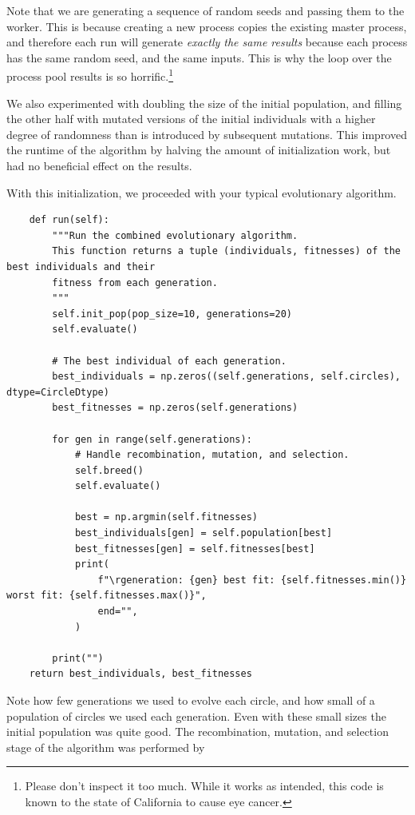 \documentclass{article}
\begin{document}
Note that we are generating a sequence of random seeds and passing them to the worker. This is because creating a new process copies the existing master process, and therefore each run will generate \textit{exactly the same results} because each process has the same random seed, and the same inputs. This is why the loop over the process pool results is so horrific.\footnote{Please don't inspect it too much. While it works as intended, this code is known to the state of California to cause eye cancer.}

We also experimented with doubling the size of the initial population, and filling the other half with mutated versions of the initial individuals with a higher degree of randomness than is introduced by subsequent mutations. This improved the runtime of the algorithm by halving the amount of initialization work, but had no beneficial effect on the results.

With this initialization, we proceeded with your typical evolutionary algorithm.

\begin{verbatim}
    def run(self):
        """Run the combined evolutionary algorithm.
        This function returns a tuple (individuals, fitnesses) of the best individuals and their
        fitness from each generation.
        """
        self.init_pop(pop_size=10, generations=20)
        self.evaluate()

        # The best individual of each generation.
        best_individuals = np.zeros((self.generations, self.circles), dtype=CircleDtype)
        best_fitnesses = np.zeros(self.generations)

        for gen in range(self.generations):
            # Handle recombination, mutation, and selection.
            self.breed()
            self.evaluate()

            best = np.argmin(self.fitnesses)
            best_individuals[gen] = self.population[best]
            best_fitnesses[gen] = self.fitnesses[best]
            print(
                f"\rgeneration: {gen} best fit: {self.fitnesses.min()} worst fit: {self.fitnesses.max()}",
                end="",
            )

        print("")
    return best_individuals, best_fitnesses
\end{verbatim}

Note how few generations we used to evolve each circle, and how small of a population of circles we used each generation. Even with these small sizes the initial population was quite good. The recombination, mutation, and selection stage of the algorithm was performed by
\end{document}
